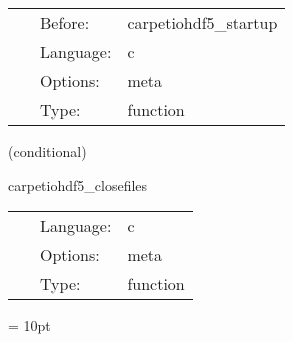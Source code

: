 \documentclass{article}
\begin{document}
\hspace{5mm}{\it overwrite 'carpetregrid::refinement\_levels' with the number of levels found in the checkpoint file } 


\hspace{5mm}

 \begin{tabular*}{160mm}{cll} 
~ & Before:  & carpetiohdf5\_startup \\ 
~ & Language:  & c \\ 
~ & Options:  & meta \\ 
~ & Type:  & function \\ 
\end{tabular*} 


\vspace{5mm}

   (conditional) 

\hspace{5mm} carpetiohdf5\_closefiles 

\hspace{5mm}{\it close all initial data checkpoint files after recovery } 


\hspace{5mm}

 \begin{tabular*}{160mm}{cll} 
~ & Language:  & c \\ 
~ & Options:  & meta \\ 
~ & Type:  & function \\ 
\end{tabular*} 



\vspace{5mm}\parskip = 10pt 
\end{document}
